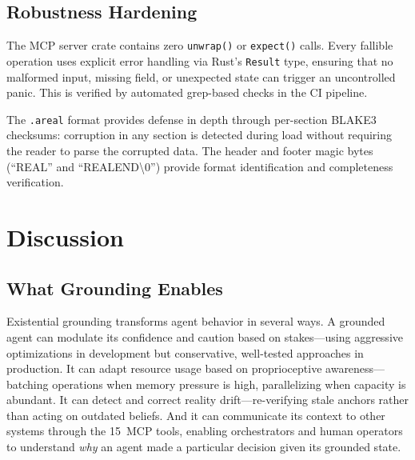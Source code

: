 \documentclass[10pt, twocolumn]{article}
\begin{document}
\subsection{Robustness Hardening}
\label{sec:robustness}

The MCP server crate contains zero \texttt{unwrap()} or \texttt{expect()} calls. Every fallible operation uses explicit error handling via Rust's \texttt{Result} type, ensuring that no malformed input, missing field, or unexpected state can trigger an uncontrolled panic. This is verified by automated grep-based checks in the CI pipeline.

The \texttt{.areal} format provides defense in depth through per-section BLAKE3 checksums: corruption in any section is detected during load without requiring the reader to parse the corrupted data. The header and footer magic bytes (``REAL'' and ``REALEND\textbackslash 0'') provide format identification and completeness verification.


\section{Discussion}
\label{sec:discussion}

\subsection{What Grounding Enables}
\label{sec:enables}

Existential grounding transforms agent behavior in several ways. A grounded agent can modulate its confidence and caution based on stakes---using aggressive optimizations in development but conservative, well-tested approaches in production. It can adapt resource usage based on proprioceptive awareness---batching operations when memory pressure is high, parallelizing when capacity is abundant. It can detect and correct reality drift---re-verifying stale anchors rather than acting on outdated beliefs. And it can communicate its context to other systems through the 15~MCP tools, enabling orchestrators and human operators to understand \emph{why} an agent made a particular decision given its grounded state.
\end{document}
